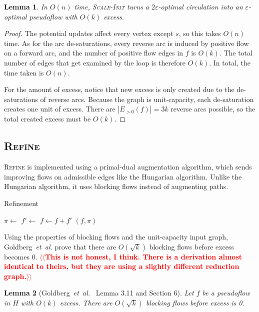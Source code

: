 \documentclass[11pt]{article}
\makeatletter
\def\etal{\textsl{et~al.}}
\def\eps{\varepsilon}
\theoremstyle{plain}
\newtheorem{lemma}{Lemma}
\def\n@te#1{\textsf{\boldmath \textbf{$\langle\!\langle$#1$\rangle\!\rangle$}}\leavevmode}
\def\note#1{\textcolor{red}{\n@te{#1}}}
\makeatother
\begin{document}
\begin{lemma}
\label{lemma:scale_init}
In $O(n)$ time, \textsc{Scale-Init} turns a $2\eps$-optimal circulation into an
$\eps$-optimal pseudoflow with $O(k)$ excess.
\end{lemma}

\begin{proof}
The potential updates affect every vertex except $s$, so this takes $O(n)$
time.
As for the arc de-saturations, every reverse arc is induced by positive flow on
a forward arc, and the number of positive flow edges in $f$ is $O(k)$.
The total number of edges that get examined by the loop is therefore $O(k)$.
In total, the time taken is $O(n)$.

For the amount of excess, notice that new excess is only created due to the
de-saturations of reverse arcs.
Because the graph is unit-capacity, each de-saturation creates one unit of
excess.
There are $|E_{>0}(f)| = 3k$ reverse arcs possible, so the total created excess
must be $O(k)$.
\end{proof}

\subsection{\textsc{Refine}}

\textsc{Refine} is implemented using a primal-dual augmentation algorithm,
which sends improving flows on admissible edges like the Hungarian algorithm.
Unlike the Hungarian algorithm, it uses blocking flows instead of augmenting
paths.

\begin{algorithm}
\caption{Refinement}
\begin{algorithmic}[1]
		\State $\pi \gets$ 
		\State $f' \gets$ 
		\State $f \gets f + f'$
	\EndWhile
	\State\Return $(f, \pi)$
\EndFunction
\end{algorithmic}
\end{algorithm}

Using the properties of blocking flows and the unit-capacity input graph,
Goldberg~{\etal} prove that there are $O(\sqrt{k})$ blocking flows before
excess becomes 0.
\note{This is not honest, I think. There is a derivation almost identical to theirs, but they are using a slightly different reduction graph.}

\begin{lemma}[Goldberg~{\etal}~\cite{GHKT17} Lemma 3.11 and Section 6]
Let $f$ be a pseudoflow in $H$ with $O(k)$ excess.
There are $O(\sqrt{k})$ blocking flows before excess is 0.
\end{lemma}
\end{document}
